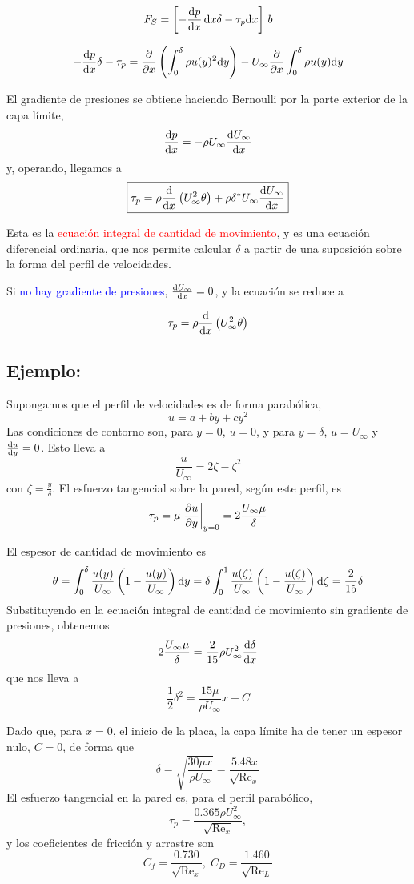	\[
	F_{S}=\left[-\frac{\textrm{d} p}{\textrm{d} x}\,\text{d} x\delta-\tau_{p}\text{d} x\right]\,b
	\]
	
	\[
	-\frac{\textrm{d} p}{\textrm{d} x}\delta-\tau_{p}=\frac{\partial }{\partial x}\left(\int_{0}^{\delta}\rho u(y)^{2}\text{d} y\right)-U_{\infty}\frac{\partial }{\partial x}\int_{0}^{\delta}\rho u(y)\text{d} y
	\]
	
	
	El gradiente de presiones se obtiene haciendo Bernoulli por la parte
	exterior de la capa límite, 
	\[
	\frac{\textrm{d} p}{\textrm{d} x}=-\rho U_{\infty}\frac{\textrm{d} U_{\infty}}{\textrm{d} x}
	\]
	y, operando, llegamos a 
	\[
	\boxed{\tau_{p}=\rho\frac{\textrm{d} }{\textrm{d} x}\left(U_{\infty}^{2}\theta\right)+\rho\delta^{*}U_{\infty}\frac{\textrm{d} U_{\infty}}{\textrm{d} x}}
	\]
	
	Esta es la \textcolor{red}{ecuación integral de cantidad de movimiento},
	y es una ecuación diferencial ordinaria, que nos permite calcular
	$\delta$ a partir de una suposición sobre la forma del perfil de
	velocidades.
	
	Si \textcolor{blue}{no hay gradiente de presiones}, $\frac{\textrm{d} U_{\infty}}{\textrm{d} x}=0$,
	y la ecuación se reduce a
	
	\[
	\tau_{p}=\rho\frac{\textrm{d} }{\textrm{d} x}\left(U_{\infty}^{2}\theta\right)
	\]
	
	
	\subsection*{Ejemplo:}
		Supongamos que el perfil de velocidades es de forma parabólica, 
		\[
		u=a+by+cy^{2}
		\]
		Las condiciones de contorno son, para $y=0$, $u=0$, y para $y=\delta$,
		$u=U_{\infty}$ y $\frac{\textrm{d} u}{\textrm{d} y}=0$. Esto lleva a 
		\[
		\frac{u}{U_{\infty}}=2\zeta-\zeta^{2}
		\]
		con $\zeta=\frac{y}{\delta}$. El esfuerzo tangencial sobre la pared,
		según este perfil, es 
		\[
		\tau_{p}=\mu\left.\frac{\partial u}{\partial y}\right|_{y=0}=2\frac{U_{\infty}\mu}{\delta}
		\]
		
		El espesor de cantidad de movimiento es {\small{}
			\[
			\theta=\int_{0}^{\delta}\frac{u(y)}{U_{\infty}}\left(1-\frac{u(y)}{U_{\infty}}\right)\text{d} y=\delta\int_{0}^{1}\frac{u(\zeta)}{U_{\infty}}\left(1-\frac{u(\zeta)}{U_{\infty}}\right)\text{d}\zeta=\frac{2}{15}\delta
			\]
		}Substituyendo en la ecuación integral de cantidad de movimiento sin
		gradiente de presiones, obtenemos 
		\[
		2\frac{U_{\infty}\mu}{\delta}=\frac{2}{15}\rho U_{\infty}^{2}\frac{\textrm{d} \delta}{\textrm{d} x}
		\]
		que nos lleva a 
		\[
		\frac{1}{2}\delta^{2}=\frac{15\mu}{\rho U_{\infty}}x+C
		\]
		
		Dado que, para $x=0$, el inicio de la placa, la capa límite ha de
		tener un espesor nulo, $C=0$, de forma que 
		\[
		\delta=\sqrt{\frac{30\mu x}{\rho U_{\infty}}}=\frac{5.48x}{\sqrt{\text{Re}_{x}}}
		\]
		El esfuerzo tangencial en la pared es, para el perfil parabólico,
		\[
		\tau_{p}=\frac{0.365\rho U_{\infty}^{2}}{\sqrt{\text{Re}_{x}}},
		\]
		y los coeficientes de fricción y arrastre son 
		\[
		C_{f}=\frac{0.730}{\sqrt{\text{Re}_{x}}},\;C_{D}=\frac{1.460}{\sqrt{\text{Re}_{L}}}
		\]


